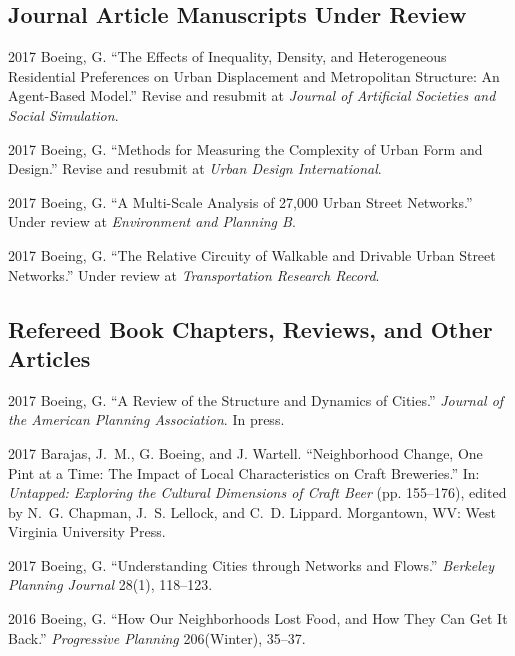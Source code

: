 \documentclass{academiccv}
\begin{document}
\subsection*{Journal Article Manuscripts Under Review}

\begin{tablist}

\item[2017] \tab Boeing, G. \enquote{The Effects of Inequality, Density, and Heterogeneous Residential Preferences on Urban Displacement and Metropolitan Structure: An Agent-Based Model.} Revise and resubmit at \emph{Journal of Artificial Societies and Social Simulation}.

\item[2017] \tab Boeing, G. \enquote{Methods for Measuring the Complexity of Urban Form and Design.} Revise and resubmit at \emph{Urban Design International}.

\item[2017] \tab Boeing, G. \enquote{A Multi-Scale Analysis of 27,000 Urban Street Networks.} Under review at \emph{Environment and Planning B}.

\item[2017] \tab Boeing, G. \enquote{The Relative Circuity of Walkable and Drivable Urban Street Networks.} Under review at \emph{Transportation Research Record}.

\end{tablist}



\subsection*{Refereed Book Chapters, Reviews, and Other Articles}

\begin{tablist}

\item[2017] \tab Boeing, G. \enquote{A Review of the Structure and Dynamics of Cities.} \emph{Journal of the American Planning Association}. In press.

\item[2017] \tab Barajas, J.~M., G. Boeing, and J. Wartell. \enquote{Neighborhood Change, One Pint at a Time: The Impact of Local Characteristics on Craft Breweries.} In: \emph{Untapped: Exploring the Cultural Dimensions of Craft Beer} (pp. 155--176), edited by N.~G. Chapman, J.~S. Lellock, and C.~D. Lippard. Morgantown, WV: West Virginia University Press.

\item[2017] \tab Boeing, G. \enquote{Understanding Cities through Networks and Flows.} \emph{Berkeley Planning Journal} 28(1), 118--123.

\item[2016] \tab Boeing, G. \enquote{How Our Neighborhoods Lost Food, and How They Can Get It Back.} \emph{Progressive Planning} 206(Winter), 35--37.

\end{tablist}
\end{document}
